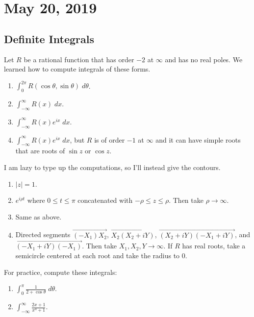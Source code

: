 \section{May 20, 2019}

\subsection{Definite Integrals}

Let $R$ be a rational function that has order $-2$ at $\infty$ and has
no real poles.
We learned how to compute integrals of these forms.
\begin{enumerate}
    \item $\int_0^{2\pi} R(\cos \theta, \sin \theta) \; d\theta$.
    \item $\int_{-\infty}^{\infty} R(x) \; dx$.
    \item $\int_{-\infty}^{\infty} R(x)e^{ix} \; dx$.
    \item $\int_{-\infty}^{\infty} R(x)e^{ix} \; dx$, but $R$
        is of order $-1$ at $\infty$ and it can have simple roots
        that are roots of $\sin z$ or $\cos z$.
\end{enumerate}

I am lazy to type up the computations, so I'll instead  give the contours.
\begin{enumerate}
    \item $|z| = 1$.
    \item $e^{i\rho t}$ where $0 \le t \le \pi$ concatenated with
        $-\rho \le z \le \rho$.
        Then take $\rho \to \infty$.
    \item Same as above.
    \item Directed segments $\overrightarrow{(-X_1)X_2}$, $\overrightarrow{X_2(X_2+iY)}$,
        $\overrightarrow{(X_2+iY)(-X_1+iY)}$, and $\overrightarrow{(-X_1+iY)(-X_1)}$.
        Then take $X_1, X_2, Y \to \infty$.
        If $R$ has real roots, take a semicircle centered at each root and take the radius
        to $0$.
\end{enumerate}

For practice, compute these integrals:
\begin{enumerate}
    \item $ \int_0^{\pi} \frac{1}{2 + \cos \theta} \; d\theta$.
    \item $ \int_{-\infty}^{\infty} \frac{2x + 1}{x^4 + 1}$.
\end{enumerate}
